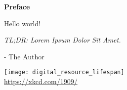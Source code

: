 \cleardoublepage
\begin{titlepage}
	{\centering
	\vspace{3cm}
	{\Huge\sffamily\bfseries Preface \par} \vspace{0.5cm}}


	\noindent
	{\Large\ttfamily Hello world! \par}
	
	\blindtext
	
	{\small \itshape TL;DR: Lorem Ipsum Dolor Sit Amet.}
	
	{
	{\small - The Author \par}}
	
	\vfill
	
	{\centering
	{\texttt{[image: digital\_resource\_lifespan]}\\
		\tiny \url{https://xkcd.com/1909/} \par}}
\end{titlepage}
